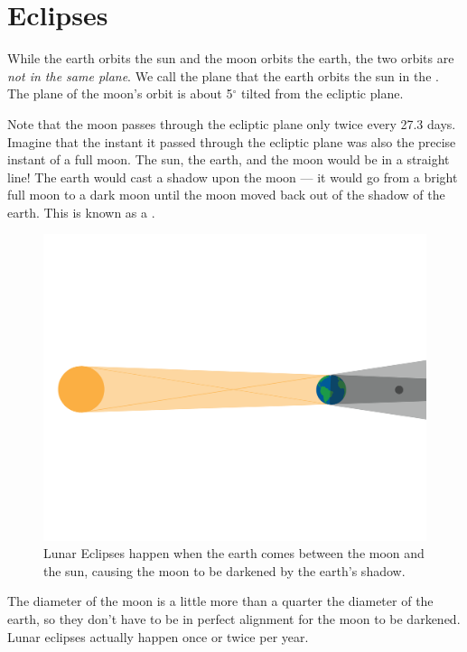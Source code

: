 \section{Eclipses}
While the earth orbits the sun and the moon orbits the earth,  the two orbits are \emph{not in the same plane}.
We call the plane that the earth orbits the sun in the .   The plane of the moon's orbit is about 5$^\circ$ tilted from the ecliptic plane.

Note that the moon passes through the ecliptic plane only twice every 27.3 days. Imagine that the instant it passed through the ecliptic plane was also the precise instant of a full moon. The sun, the earth, and the moon would be in a straight line!  The earth would cast a shadow upon the moon --- it would go from a bright full moon to a dark moon until the moon moved back out of the shadow of the earth. This is known as a .
\begin{figure}[htbp]
    \centering
    \includegraphics[width=.75\textwidth]{lunarEclipse.png}
    \caption{Lunar Eclipses happen when the earth comes between the moon and the sun, causing the moon to be darkened by the earth's shadow.}
    \label{fig:example}
\end{figure}

The diameter of the moon is a little more than a quarter the diameter of the earth, so they don't have to be in perfect alignment for the moon to be darkened. Lunar eclipses actually happen once or twice per year.

